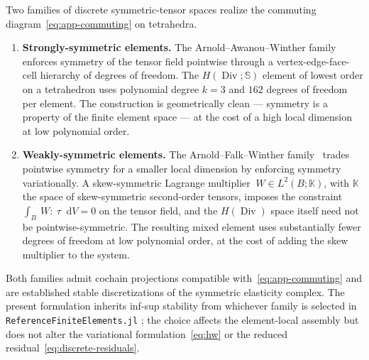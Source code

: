 \documentclass[12pt]{article}
\newcommand{\Syms}{\mathbb{S}}
\DeclareMathOperator{\Div}{Div}
\newcommand*\diff{\mathop{}\!\mathrm{d}}
\begin{document}
Two families of discrete symmetric-tensor spaces realize the commuting
diagram~\eqref{eq:app-commuting} on tetrahedra.

\begin{enumerate}
  \item \textbf{Strongly-symmetric elements.} The
    Arnold--Awanou--Winther
    family~\citep{Arnold.Awanou.Winther:2008} enforces symmetry of
    the tensor field pointwise through a vertex-edge-face-cell
    hierarchy of degrees of freedom. The $H(\Div; \Syms)$ element of
    lowest order on a tetrahedron uses polynomial degree $k = 3$ and
    $162$ degrees of freedom per element. The construction is
    geometrically clean --- symmetry is a property of the finite
    element space --- at the cost of a high local dimension at low
    polynomial order.
  \item \textbf{Weakly-symmetric elements.} The
    Arnold--Falk--Winther family~\citep{Arnold.Falk.Winther:2007}
    trades pointwise symmetry for a smaller local dimension by
    enforcing symmetry variationally. A skew-symmetric Lagrange
    multiplier $~W \in L^2(B; \mathbb{K})$, with $\mathbb{K}$ the
    space of skew-symmetric second-order tensors, imposes the
    constraint
    $\int_B ~W : ~\tau \diff V = 0$ on the tensor field, and
    the $H(\Div)$ space itself need not be pointwise-symmetric.
    The resulting mixed element uses substantially fewer degrees of
    freedom at low polynomial order, at the cost of adding the skew
    multiplier to the system.
\end{enumerate}

Both families admit cochain projections compatible
with~\eqref{eq:app-commuting} and are established stable
discretizations of the symmetric elasticity complex. The present
formulation inherits inf-sup stability from whichever family is
selected in \texttt{ReferenceFiniteElements.jl}
\citep{Cthonios:RFE}; the choice affects the element-local assembly
but does not alter the variational formulation~\eqref{eq:hw} or the
reduced residual~\eqref{eq:discrete-residuals}.




\end{document}
